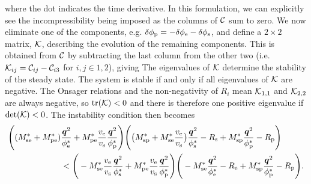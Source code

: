 where the dot indicates the time derivative. In this formulation, we can explicitly see the incompressibility being imposed as the columns of $\cal C$ sum to zero.
We now eliminate one of the components, e.g. $\delta\phi_{\mathrm{p}} = -\delta\phi_{\mathrm{e}} - \delta\phi_{\mathrm{s}}$, and define a $2\times2$ matrix, $\cal K$, describing the evolution of the remaining components. This is obtained from $\cal C$ by subtracting the last column from the other two (i.e. ${\cal K}_{ij} = {\cal C}_{ij} - {\cal C}_{i3}$ for $i, j \in {1, 2}$), giving
\newline
\newline
{}
The eigenvalues of ${\cal K}$ determine the stability of the steady state. The system is stable if and only if all eigenvalues of ${\cal K}$ are negative. The Onsager relations and the non-negativity of $R_i$ mean ${\cal K}_{1,1}$ and ${\cal K}_{2,2}$ are always negative, so $\text{tr}({\cal K}) < 0$ and there is therefore one positive eigenvalue if $\det({\cal K})<0$. The instability condition then becomes
\begin{equation}
\begin{split}
    \Bigg((M_{\mathrm{se}}^*+M_{\mathrm{pe}}^*)&\frac{\bm{q}^2}{\phi_{\mathrm{e}}^*} + M_{\mathrm{pe}}^*\frac{v_{\mathrm{e}}}{v_{\mathrm{s}}}\frac{\bm{q}^2}{\phi_{\mathrm{p}}^*}\Bigg)\Bigg(\big(M_{\mathrm{sp}}^* + M_{\mathrm{se}}^*\frac{v_{\mathrm{e}}}{v_{\mathrm{s}}}\big)\frac{\bm{q}^2}{\phi_{\mathrm{s}}^*} - R_\mathrm{s}  + M_{\mathrm{sp}}^*\frac{\bm{q}^2}{\phi_{\mathrm{p}}^*} - R_\mathrm{p} \Bigg) \\
    &< \Bigg(-M_{\mathrm{se}}^*\frac{v_{\mathrm{e}}}{v_{\mathrm{s}}}\frac{\bm{q}^2}{\phi_{\mathrm{s}}^*} + M_{\mathrm{pe}}^*\frac{v_{\mathrm{e}}}{v_{\mathrm{s}}}\frac{\bm{q}^2}{\phi_{\mathrm{p}}^*}\Bigg)\Bigg(-M_{\mathrm{se}}^*\frac{\bm{q}^2}{\phi_{\mathrm{e}}^*} - R_\mathrm{e}  + M_{\mathrm{sp}}^*\frac{\bm{q}^2}{\phi_{\mathrm{p}}^*} - R_\mathrm{p} \Bigg).
\end{split}
\label{hi_ord_ins}
\end{equation}
